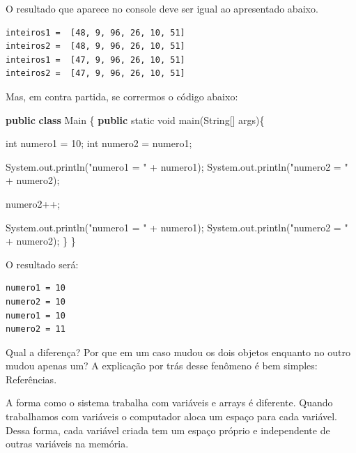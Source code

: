 \documentclass[
]{book}
\newenvironment{Shaded}{\begin{snugshade}}{\end{snugshade}}
\newcommand{\BuiltInTok}[1]{#1}
\newcommand{\DataTypeTok}[1]{\textcolor[rgb]{0.13,0.29,0.53}{#1}}
\newcommand{\DecValTok}[1]{\textcolor[rgb]{0.00,0.00,0.81}{#1}}
\newcommand{\FunctionTok}[1]{\textcolor[rgb]{0.00,0.00,0.00}{#1}}
\newcommand{\KeywordTok}[1]{\textcolor[rgb]{0.13,0.29,0.53}{\textbf{#1}}}
\newcommand{\NormalTok}[1]{#1}
\newcommand{\StringTok}[1]{\textcolor[rgb]{0.31,0.60,0.02}{#1}}
\begin{document}
O resultado que aparece no console deve ser igual ao apresentado abaixo.

\begin{verbatim}
inteiros1 =  [48, 9, 96, 26, 10, 51]
inteiros2 =  [48, 9, 96, 26, 10, 51]
inteiros1 =  [47, 9, 96, 26, 10, 51]
inteiros2 =  [47, 9, 96, 26, 10, 51]
\end{verbatim}

Mas, em contra partida, se corrermos o código abaixo:

\begin{Shaded}
\begin{Highlighting}[]
\KeywordTok{public} \KeywordTok{class}\NormalTok{ Main \{}
    \KeywordTok{public} \DataTypeTok{static} \DataTypeTok{void} \FunctionTok{main}\NormalTok{(}\BuiltInTok{String}\NormalTok{[] args)\{}

        \DataTypeTok{int}\NormalTok{ numero1 = }\DecValTok{10}\NormalTok{;}
        \DataTypeTok{int}\NormalTok{ numero2 = numero1;}

        \BuiltInTok{System}\NormalTok{.}\FunctionTok{out}\NormalTok{.}\FunctionTok{println}\NormalTok{(}\StringTok{"numero1 = "}\NormalTok{ + numero1);}
        \BuiltInTok{System}\NormalTok{.}\FunctionTok{out}\NormalTok{.}\FunctionTok{println}\NormalTok{(}\StringTok{"numero2 = "}\NormalTok{ + numero2);}

\NormalTok{        numero2++;}

        \BuiltInTok{System}\NormalTok{.}\FunctionTok{out}\NormalTok{.}\FunctionTok{println}\NormalTok{(}\StringTok{"numero1 = "}\NormalTok{ + numero1);}
        \BuiltInTok{System}\NormalTok{.}\FunctionTok{out}\NormalTok{.}\FunctionTok{println}\NormalTok{(}\StringTok{"numero2 = "}\NormalTok{ + numero2);}
\NormalTok{    \}}
\NormalTok{\}}
\end{Highlighting}
\end{Shaded}

O resultado será:

\begin{verbatim}
numero1 = 10
numero2 = 10
numero1 = 10
numero2 = 11
\end{verbatim}

Qual a diferença? Por que em um caso mudou os dois objetos enquanto no outro mudou apenas um? A explicação por trás desse fenômeno é bem simples: Referências.

A forma como o sistema trabalha com variáveis e arrays é diferente. Quando trabalhamos com variáveis o computador aloca um espaço para cada variável. Dessa forma, cada variável criada tem um espaço próprio e independente de outras variáveis na memória.
\end{document}
